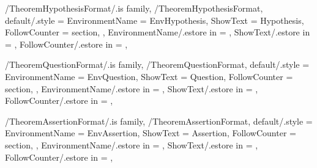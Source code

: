 \pgfkeys
{
  /TheoremHypothesisFormat/.is family, /TheoremHypothesisFormat,
  default/.style =
  {
    EnvironmentName = {EnvHypothesis},
    ShowText = {Hypothesis},
    FollowCounter = section,
  },
  EnvironmentName/.estore in = \GetTheoremHypothesisFormatEnvironmentName,
  ShowText/.estore in = \GetTheoremHypothesisFormatShowText,
  FollowCounter/.estore in = \GetTheoremHypothesisFormatFollowCounter,
} %

\newcommand{\InsertHypothesis}[2][\empty]
{%
  \InsertTheoremContent[#1]{\GetTheoremHypothesisFormatEnvironmentName}{#2}%
} %

\newcommand{\InitTheoremHypothesisFormat}
{%
  \theoremstyle{definition}%
  \ifthenelse{\equal{\GetTheoremHypothesisFormatFollowCounter}{\empty}}%
  {%
    \newtheorem{%
      \GetTheoremHypothesisFormatEnvironmentName}{%
      \GetTheoremHypothesisFormatShowText}%
  }%
  {%
    \newtheorem{%
      \GetTheoremHypothesisFormatEnvironmentName}{%
      \GetTheoremHypothesisFormatShowText}[%
      \GetTheoremHypothesisFormatFollowCounter]%
  }%
} %


\pgfkeys
{
  /TheoremQuestionFormat/.is family, /TheoremQuestionFormat,
  default/.style =
  {
    EnvironmentName = {EnvQuestion},
    ShowText = {Question},
    FollowCounter = section,
  },
  EnvironmentName/.estore in = \GetTheoremQuestionFormatEnvironmentName,
  ShowText/.estore in = \GetTheoremQuestionFormatShowText,
  FollowCounter/.estore in = \GetTheoremQuestionFormatFollowCounter,
} %

\newcommand{\InsertQuestion}[2][\empty]
{%
  \InsertTheoremContent[#1]{\GetTheoremQuestionFormatEnvironmentName}{#2}%
} %

\newcommand{\InitTheoremQuestionFormat}
{%
  \theoremstyle{definition}%
  \ifthenelse{\equal{\GetTheoremQuestionFormatFollowCounter}{\empty}}%
  {%
    \newtheorem{%
      \GetTheoremQuestionFormatEnvironmentName}{%
      \GetTheoremQuestionFormatShowText}%
  }%
  {%
    \newtheorem{%
      \GetTheoremQuestionFormatEnvironmentName}{%
      \GetTheoremQuestionFormatShowText}[%
      \GetTheoremQuestionFormatFollowCounter]%
  }%
} %


\pgfkeys
{
  /TheoremAssertionFormat/.is family, /TheoremAssertionFormat,
  default/.style =
  {
    EnvironmentName = {EnvAssertion},
    ShowText = {Assertion},
    FollowCounter = section,
  },
  EnvironmentName/.estore in = \GetTheoremAssertionFormatEnvironmentName,
  ShowText/.estore in = \GetTheoremAssertionFormatShowText,
  FollowCounter/.estore in = \GetTheoremAssertionFormatFollowCounter,
} %

